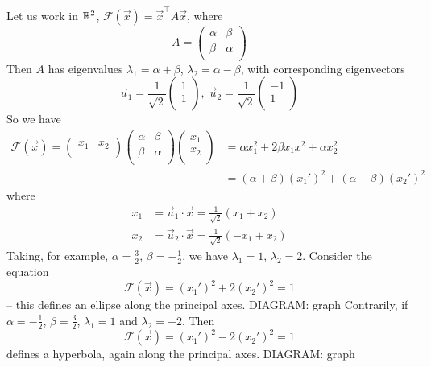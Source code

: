 \documentclass{../../template/note}
\begin{document}
    \begin{example}
        Let us work in \(\mathbb R^2\), \(\mathcal F(\vec x) = \vec x^\intercal A \vec x\), where
        \[
            A = \begin{pmatrix}
                \alpha & \beta \\
                \beta & \alpha \\
            \end{pmatrix}
        \]
        Then \(A\) has eigenvalues \(\lambda_1 = \alpha + \beta\), \(\lambda_2 = \alpha - \beta\), with corresponding eigenvectors
        \[
            \vec u_1 = \frac{1}{\sqrt 2} \begin{pmatrix}
                1 \\
                1 \\
            \end{pmatrix}, \; \vec u_2 = \frac{1}{\sqrt 2} \begin{pmatrix}
                -1 \\
                1 \\
            \end{pmatrix}
        \]
        So we have
        \begin{align*}
            \mathcal F(\vec x) = \begin{pmatrix}
             x_1 & x_2 \\
            \end{pmatrix} \begin{pmatrix}
             \alpha & \beta \\
             \beta & \alpha \\
            \end{pmatrix} \begin{pmatrix}
             x_1 \\
             x_2 \\
            \end{pmatrix} &= \alpha x_1^2 + 2\beta x_1x^2 + \alpha x_2^2 \\
            &= (\alpha + \beta)(x_1')^2 + (\alpha-\beta)(x_2')^2
        \end{align*}
        where
        \begin{align*}
            x_1 &= \vec u_1 \cdot \vec x = \frac{1}{\sqrt 2}(x_1 + x_2) \\
            x_2 &= \vec u_2 \cdot \vec x = \frac{1}{\sqrt 2}(-x_1 + x_2)
        \end{align*}
        Taking, for example, \(\alpha = \frac{3}{2}\), \(\beta = -\frac{1}{2}\), we have \(\lambda_1 = 1\), \(\lambda_2 = 2\). Consider the equation
        \[
            \mathcal F(\vec x) = (x_1')^2 + 2(x_2')^2 = 1
        \]
        -- this defines an ellipse along the principal axes.
        DIAGRAM: graph
        Contrarily, if \(\alpha = -\frac{1}{2}\), \(\beta = \frac{3}{2}\), \(\lambda_1 = 1\) and \(\lambda_2 = -2\). Then
        \[
            \mathcal F(\vec x) = (x_1')^2 - 2(x_2')^2 = 1
        \]
        defines a hyperbola, again along the principal axes.
        DIAGRAM: graph
    \end{example}
    
\end{document}
